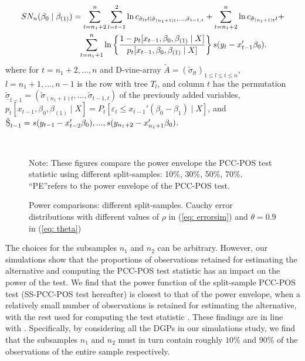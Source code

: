 \documentclass[harvard,11pt]{article}
\begin{document}
\begingroup
\allowdisplaybreaks
\begin{align*}
SN_{n}(\beta_0\mid\beta _{(1)})&=\sum\limits_{t=n_1+2}^{n}\sum\limits_{l=t-1}^{2}\ln c_{\tilde{\sigma}_{lt}t\mid \tilde{\sigma}_{(n_1+1)t},...,\tilde{\sigma}_{t-1,t}}+\sum\limits_{t=n_1+2}^{n}\ln c_{\tilde{\sigma}_{(n_1+1)t}t}+\\
&\textcolor{white}{=}\sum\limits_{t=n_1+1}^{n}\ln\left\{\frac{1-p_t[x_{t-1},\beta_0,\beta_{(1)}\mid X]}{p_t[x_{t-1},\beta_0,\beta_{(1)}\mid X]}\right\}s(y_t-x_{t-1}'\beta_0).
\end{align*}
\endgroup
where for $t=n_1+2,...,n$ and D-vine-array $\tilde{A}=(\tilde{\sigma}_{lt})_{1\leq l\leq t\leq n}$, $l=n_1+1,...,n-1$ is the row with tree $T_l$, and column $t$ has the permutation $\tilde{\underline{\sigma}}_{t-1}=(\tilde{\sigma}_{(n_1+1)t},...,\tilde{\sigma}_{t-1,t})$ of the previously added variables, $p_t[x_{t-1},\beta_0,\beta_{(1)}\mid X]=P_t[\varepsilon_t\leq x_{t-1}'(\beta_0-\beta_1)\mid X]$, and $\tilde{\text{\b{S}}}_{t-1}=s(y_{t-1}-x_{t-2}'\beta_0),...,s(y_{n_1+2}-x_{n_1+1}'\beta_0)$.
\begin{figure}[tbph]
\caption{Power comparisons: different split-samples. Cauchy error distributions with
different values of $\rho $ in (\ref{eq: errorsim}) and $\theta =0.9$ in (\ref{eq: theta})}
\begin{center}
 \\[0pt]
\end{center}
\doublespacing
Note: These figures compare the power
envelope the PCC-POS test statistic using different split-samples: 10\%, 30\%, 50\%, 70\%. \textquotedblleft PE\textquotedblright refers to the power envelope of the PCC-POS test.
\label{fig: SS28}
\end{figure}
The choices for the subsamples $n_1$ and $n_2$ can be arbitrary. However, our simulations show that the proportions of observations retained for estimating the alternative and computing the PCC-POS test statistic has an impact on the power of the test. We find that the power function of the split-sample PCC-POS test (SS-PCC-POS test hereafter) is closest to that of the power envelope, when a relatively small number of observations is retained for estimating the alternative, with the rest used for computing the test statistic . These findings are in line with \citet{dufour2010exact}. Specifically, by considering all the DGPs in our simulations study, we find that the subsamples $n_1$ and $n_2$ must in turn contain roughly $10\%$ and $90\%$ of the observations of the entire sample respectively.  
\end{document}
